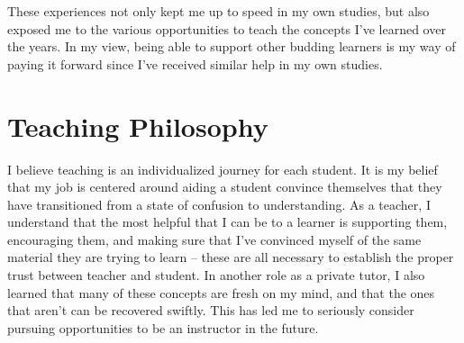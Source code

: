 \documentclass{scrartcl}
\begin{document}
\par These experiences not only kept me up to speed in my own studies, but also exposed me to the various opportunities to teach the concepts I've learned over the years. In my view, being able to support other budding learners is my way of paying it forward since I've received similar help in my own studies.

\section{Teaching Philosophy}

\par I believe teaching is an individualized journey for each student. It is my belief that my job is centered around aiding a student convince themselves that they have transitioned from a state of confusion to understanding. As a teacher, I understand that the most helpful that I can be to a learner is supporting them, encouraging them, and making sure that I've convinced myself of the same material they are trying to learn -- these are all necessary to establish the proper trust between teacher and student. In another role as a private tutor, I also learned that many of these concepts are fresh on my mind, and that the ones that aren't can be recovered swiftly. This has led me to seriously consider pursuing opportunities to be an instructor in the future.
\end{document}
